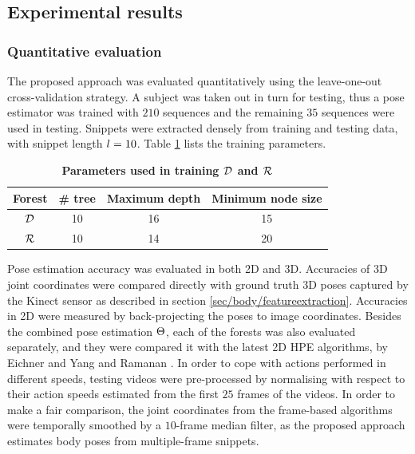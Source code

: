 \subsection{Experimental results}
\subsubsection{Quantitative evaluation}
\label{sec/body/quant}
The proposed approach was evaluated quantitatively using the leave-one-out cross-validation strategy. A subject was taken out in turn for testing, thus a pose estimator was trained with $210$ sequences and the remaining $35$ sequences were used in testing. 
Snippets were extracted densely from training and testing data, with snippet length $l = 10$. Table \ref{tab/body/rf_train_params} lists the training parameters. 

\begin{table}[ht]
	\centering
	\begin{tabular}{|c|c|c|c|}
		\hline 
		\textbf{Forest} & \textbf{\# tree} & \textbf{Maximum depth} & \textbf{Minimum node size} \\ \hline 
		$\mathcal{D}$ & 10 & 16 & 15 \\ \hline 
		$\mathcal{R}$ & 10 & 14 & 20 \\ \hline 
	\end{tabular} 
	\caption{\textbf{Parameters used in training $\mathcal{D}$ and $\mathcal{R}$}}
	\label{tab/body/rf_train_params}
\end{table}


Pose estimation accuracy was evaluated in both 2D and 3D. Accuracies of 3D joint coordinates were compared directly with ground truth 3D poses captured by the Kinect sensor as described in section \ref{sec/body/featureextraction}. Accuracies in 2D were measured by back-projecting the poses to image coordinates.  
Besides the combined pose estimation $\Theta$, each of the forests was also evaluated separately, and they were compared it with the latest 2D HPE algorithms, by Eichner \etal \cite{Eichner2012} and Yang and Ramanan \cite{Yang2011}. 
In order to cope with actions performed in different speeds, testing videos were pre-processed by normalising with respect to their action speeds estimated from the first $25$ frames of the videos.
In order to make a fair comparison, the joint coordinates from the frame-based algorithms were temporally smoothed by a $10$-frame median filter, as the proposed approach estimates body poses from multiple-frame snippets. 

